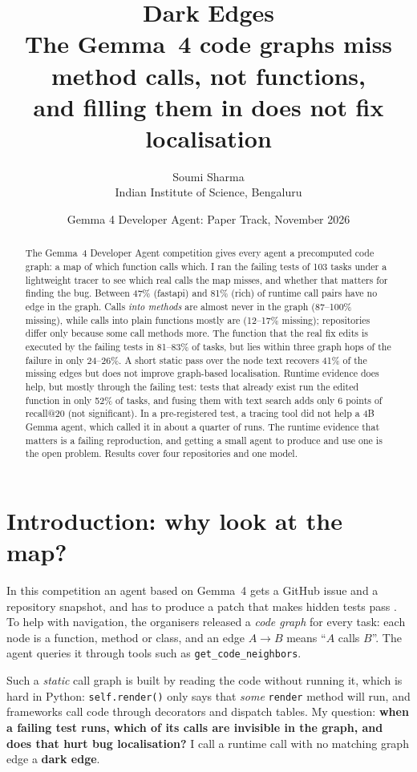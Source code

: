 \documentclass[11pt]{article}
\title{\textbf{Dark Edges}\\[0.3em]
\large The Gemma~4 code graphs miss method calls, not functions,\\ and filling them in does not fix localisation}
\author{Soumi Sharma\\ Indian Institute of Science, Bengaluru}
\date{Gemma 4 Developer Agent: Paper Track, November 2026}
\begin{document}
\maketitle

\begin{abstract}
\noindent
The Gemma~4 Developer Agent competition gives every agent a precomputed code graph: a map of which function calls which. I ran the failing tests of 103 tasks under a lightweight tracer to see which real calls the map misses, and whether that matters for finding the bug. Between 47\% (fastapi) and 81\% (rich) of runtime call pairs have no edge in the graph. Calls \emph{into methods} are almost never in the graph (87--100\% missing), while calls into plain functions mostly are (12--17\% missing); repositories differ only because some call methods more. The function that the real fix edits is executed by the failing tests in 81--83\% of tasks, but lies within three graph hops of the failure in only 24--26\%. A short static pass over the node text recovers 41\% of the missing edges but does not improve graph-based localisation. Runtime evidence does help, but mostly through the failing test: tests that already exist run the edited function in only 52\% of tasks, and fusing them with text search adds only 6 points of recall@20 (not significant). In a pre-registered test, a tracing tool did not help a 4B Gemma agent, which called it in about a quarter of runs. The runtime evidence that matters is a failing reproduction, and getting a small agent to produce and use one is the open problem. Results cover four repositories and one model.
\end{abstract}

\section{Introduction: why look at the map?}

In this competition an agent based on Gemma~4 gets a GitHub issue and a repository snapshot, and has to produce a patch that makes hidden tests pass \citep{kaggle2026paper}. To help with navigation, the organisers released a \emph{code graph} for every task: each node is a function, method or class, and an edge $A \rightarrow B$ means ``$A$ calls $B$''. The agent queries it through tools such as \texttt{get\_code\_neighbors}.

Such a \emph{static} call graph is built by reading the code without running it, which is hard in Python: \texttt{self.render()} only says that \emph{some} \texttt{render} method will run, and frameworks call code through decorators and dispatch tables. My question: \textbf{when a failing test runs, which of its calls are invisible in the graph, and does that hurt bug localisation?} I call a runtime call with no matching graph edge a \textbf{dark edge}.
\end{document}
